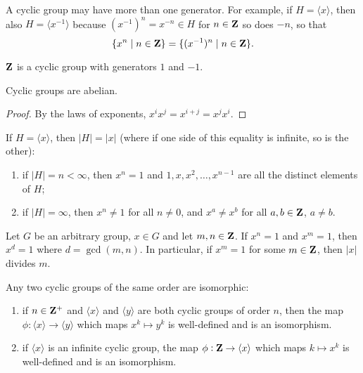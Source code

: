 \begin{remark}
A cyclic group may have more than one generator. For example, if $H=\langle x\rangle$, then also $H=\langle x^{-1}\rangle$ because $(x^{-1})^n=x^{-n}\in H$ for $n\in\mathbf Z$ so does $-n$, so that
\[\{x^n\mid n\in\mathbf Z\}=\{(x^{-1})^n\mid n\in\mathbf Z\}.\] 
\end{remark}

\begin{example}
$\mathbf Z$ is a cyclic group with generators $1$ and $-1$.
\end{example}

\begin{proposition}
Cyclic groups are abelian.
\end{proposition}

\begin{proof}
By the laws of exponents, $x^i x^j=x^{i+j}=x^j x^i$.
\end{proof}

\begin{proposition}
If $H=\langle x\rangle$, then $|H|=|x|$ (where if one side of this equality is infinite, so is the other):
\begin{enumerate}[label=(\arabic*)]
\item if $|H|=n<\infty$, then $x^n=1$ and $1,x,x^2,\dots,x^{n-1}$ are all the distinct elements of $H$;
\item if $|H|=\infty$, then $x^n\neq1$ for all $n\neq0$, and $x^a\neq x^b$ for all $a,b\in\mathbf Z$, $a\neq b$.
\end{enumerate}
\end{proposition}

\begin{proposition}
Let $G$ be an arbitrary group, $x\in G$ and let $m,n\in\mathbf Z$. If $x^n=1$ and $x^m=1$, then $x^d=1$ where $d=\gcd(m,n)$. In particular, if $x^m=1$ for some $m\in\mathbf Z$, then $|x|$ divides $m$.
\end{proposition}

\begin{theorem}
Any two cyclic groups of the same order are isomorphic:
\begin{enumerate}[label=(\arabic*)]
\item if $n\in\mathbf Z^+$ and $\langle x\rangle$ and $\langle y\rangle$ are both cyclic groups of order $n$, then the map $\phi:\langle x\rangle\to\langle y\rangle$ which maps $x^k\mapsto y^k$ is well-defined and is an isomorphism.
\item if $\langle x\rangle$ is an infinite cyclic group, the map $\phi:\mathbf Z\to\langle x\rangle$ which maps $k\mapsto x^k$ is well-defined and is an isomorphism.
\end{enumerate}
\end{theorem}

